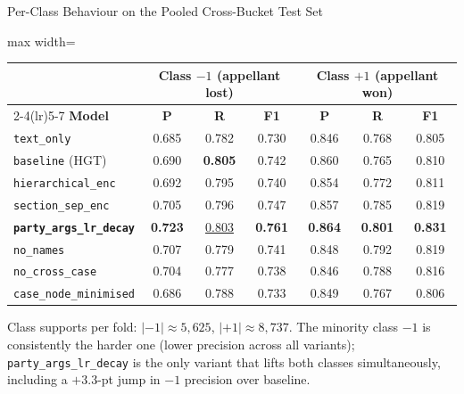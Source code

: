 \documentclass[aspectratio=169,11pt]{beamer}
\begin{document}
\begin{frame}{Per-Class Behaviour on the Pooled Cross-Bucket Test Set}
  \scriptsize
  \centering
  \setlength{\tabcolsep}{5pt}
  \begin{adjustbox}{max width=\textwidth}
    \begin{tabular}{lcccccc}
      \toprule
       & \multicolumn{3}{c}{\textbf{Class $-1$ (appellant lost)}} & \multicolumn{3}{c}{\textbf{Class $+1$ (appellant won)}} \\
      \cmidrule(lr){2-4}\cmidrule(lr){5-7}
      \textbf{Model} & \textbf{P} & \textbf{R} & \textbf{F1} & \textbf{P} & \textbf{R} & \textbf{F1} \\
      \midrule
      \texttt{text\_only}                       & 0.685 & 0.782          & 0.730 & 0.846          & 0.768 & 0.805 \\
      \texttt{baseline} (HGT)                   & 0.690 & \textbf{0.805} & 0.742 & 0.860          & 0.765 & 0.810 \\
      \texttt{hierarchical\_enc}                & 0.692 & 0.795          & 0.740 & 0.854          & 0.772 & 0.811 \\
      \texttt{section\_sep\_enc}                & 0.705 & 0.796          & 0.747 & 0.857          & 0.785 & 0.819 \\
      \textbf{\texttt{party\_args\_lr\_decay}}  & \textbf{0.723} & \underline{0.803} & \textbf{0.761} & \textbf{0.864} & \textbf{0.801} & \textbf{0.831} \\
      \texttt{no\_names}                        & 0.707 & 0.779          & 0.741 & 0.848          & 0.792 & 0.819 \\
      \texttt{no\_cross\_case}                  & 0.704 & 0.777          & 0.738 & 0.846          & 0.788 & 0.816 \\
      \texttt{case\_node\_minimised}            & 0.686 & 0.788          & 0.733 & 0.849          & 0.767 & 0.806 \\
      \bottomrule
    \end{tabular}
  \end{adjustbox}

  \vspace{0.5em}
  \scriptsize Class supports per fold: $|{-1}|\!\approx\!5{,}625$, $|{+1}|\!\approx\!8{,}737$. The minority class $-1$ is consistently the harder one (lower precision across all variants); \texttt{party\_args\_lr\_decay} is the only variant that lifts both classes simultaneously, including a $+3.3$-pt jump in $-1$ precision over baseline.
\end{frame}
\end{document}
